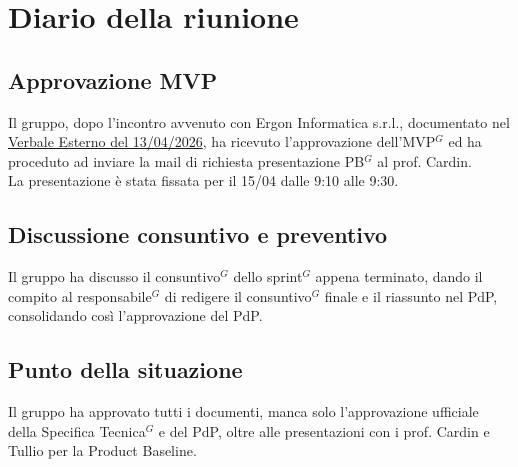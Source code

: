 \section{Diario della riunione}

\subsection{Approvazione MVP}
Il gruppo, dopo l'incontro avvenuto con Ergon Informatica s.r.l., documentato nel \href{https://nullpointersgroup.github.io/Documentazione/output/PB/Verbali%20Esterni/2026-04-13_verbale_esterno.pdf}{Verbale Esterno del 13/04/2026}, ha ricevuto l'approvazione dell'MVP$^G$ ed ha proceduto ad inviare la mail di richiesta presentazione PB$^G$ al prof. Cardin.\\
La presentazione è stata fissata per il 15/04 dalle 9:10 alle 9:30.

\subsection{Discussione consuntivo e preventivo}
Il gruppo ha discusso il consuntivo$^G$ dello sprint$^G$ appena terminato, dando il compito al responsabile$^G$ di redigere il consuntivo$^G$ finale e il riassunto nel PdP, consolidando così l'approvazione del PdP.\\

\subsection{Punto della situazione}
Il gruppo ha approvato tutti i documenti, manca solo l'approvazione ufficiale della Specifica Tecnica$^G$ e del PdP, oltre alle presentazioni con i prof. Cardin e Tullio per la Product Baseline.